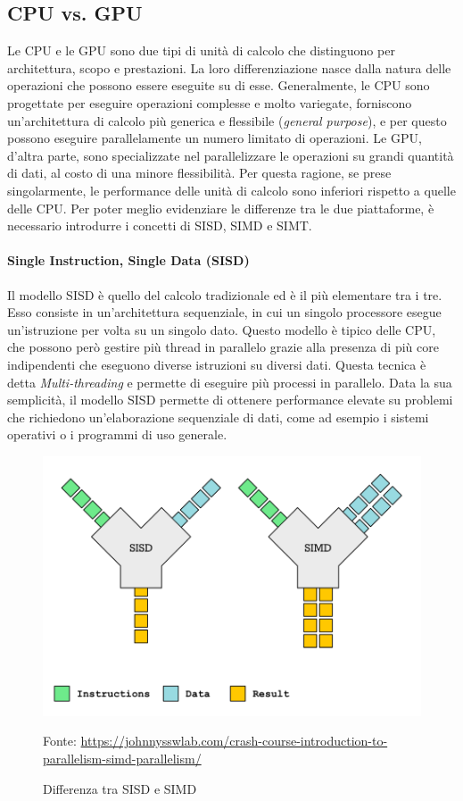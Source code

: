 \subsection{CPU vs. GPU}
\label{subsec:cpuvsgpu}

Le CPU e le GPU sono due tipi di unità di calcolo che distinguono per architettura,
scopo e prestazioni. La loro differenziazione nasce dalla natura delle operazioni
che possono essere eseguite su di esse. Generalmente, le CPU sono progettate per
eseguire operazioni complesse e molto variegate, forniscono un'architettura di
calcolo più generica e flessibile (\textit{general purpose}), e per questo
possono eseguire parallelamente un numero limitato di operazioni. Le GPU, d'altra
parte, sono specializzate nel parallelizzare le operazioni su grandi quantità di
dati, al costo di una minore flessibilità. Per questa ragione, se prese
singolarmente, le performance delle unità di calcolo sono inferiori rispetto a quelle
delle CPU. Per poter meglio evidenziare le differenze tra le due piattaforme, è necessario
introdurre i concetti di SISD, SIMD e SIMT.

\paragraph{Single Instruction, Single Data (SISD)}
\label{para:simd}

Il modello SISD è quello del calcolo tradizionale ed è il più elementare tra i
tre. Esso consiste in un'architettura sequenziale, in cui un singolo processore
esegue un'istruzione per volta su un singolo dato. Questo modello è tipico delle
CPU, che possono però gestire più thread in parallelo grazie alla presenza di
più core indipendenti che eseguono diverse istruzioni su diversi dati. Questa tecnica
è detta \textit{Multi-threading} e permette di eseguire più processi in
parallelo. Data la sua semplicità, il modello SISD permette di ottenere
performance elevate su problemi che richiedono un'elaborazione sequenziale di
dati, come ad esempio i sistemi operativi o i programmi di uso generale.

\begin{figure}[h!]
  \centering
  \includegraphics[width=.40\linewidth]{images/examples/sisd-simd.png}
  \caption{Differenza tra SISD e SIMD}
  \label{fig:sisd-simt} \footnotesize{Fonte: \url{https://johnnysswlab.com/crash-course-introduction-to-parallelism-simd-parallelism/}}
\end{figure}

